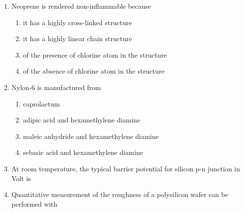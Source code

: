 \documentclass[a4paper,10pt]{article}
\begin{document}
\begin{enumerate}
    \item Neoprene is rendered non-inflammable because
    
    \hfill{}
    \begin{enumerate}[label=\Alph*)]
        \item it has a highly cross-linked structure
        \item it has a highly linear chain structure
        \item of the presence of chlorine atom in the structure
        \item of the absence of chlorine atom in the structure
    \end{enumerate}

    \item Nylon-6 is manufactured from
    
    \hfill{}
    \begin{enumerate}[label=\Alph*)]
        \item caprolactum
        \item adipic acid and hexamethylene diamine
        \item maleic anhydride and hexamethylene diamine
        \item sebasic acid and hexamethylene diamine
    \end{enumerate}

    \item At room temperature, the typical barrier potential for silicon p-n junction in Volt  is
    
    \hfill{}
    \begin{enumerate}[label=\Alph*)]
    \end{enumerate}

    \item Quantitative measurement of the roughness of a polysilicon wafer can be performed with
    
    \hfill{}
    \begin{enumerate}[label=\Alph*)]
    \end{enumerate}


\end{enumerate}
\end{document}
